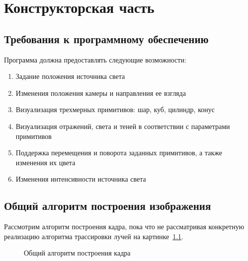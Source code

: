 
\chapter{Конструкторская часть}

\section{Требования к программному обеспечению}
Программа должна предоставлять следующие возможности:
\begin{enumerate}
	\item Задание положения источника света
	\item Изменения положения камеры и направления ее взгляда
	\item Визуализация трехмерных примитивов: шар, куб, цилиндр, конус
	\item Визуализация отражений, света и теней в соответствии с параметрами примитивов
	\item Поддержка перемещения и поворота заданных примитивов, а также изменения их цвета
	\item Изменения интенсивности источника света
\end{enumerate}

\section{Общий алгоритм построения изображения}
Рассмотрим алгоритм построения кадра, пока что не рассматривая конкретную реализацию алгоритма трассировки лучей на картинке~\ref{fig:frame_algo}.


\begin{figure}[H]
	\centering
	
	\caption{Общий алгоритм построения кадра}
	\label{fig:frame_algo}
\end{figure}



